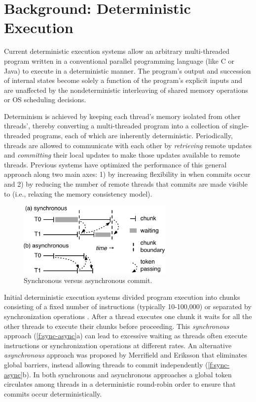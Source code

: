 \section{Background: Deterministic Execution}

Current deterministic execution systems \cite{liu_dthreads:_2011,merrifield_conversion:_2013,kai_lu_efficient_2014} allow an arbitrary multi-threaded program written in a conventional parallel programming language (like C or Java) to execute in a deterministic manner. The program's output and succession of internal states become solely a function of the program's explicit inputs and are unaffected by the nondeterministic interleaving of shared memory operations or OS scheduling decisions.

Determinism is achieved by keeping each thread's memory isolated from other threads', thereby converting a multi-threaded program into a collection of single-threaded programs, each of which are inherently deterministic. Periodically, threads are allowed to communicate with each other by \emph{retrieving} remote updates and \emph{committing} their local updates to make those updates available to remote threads. Previous systems have optimized the performance of this general approach along two main axes: 1) by increasing flexibility in when commits occur and 2) by reducing the number of remote threads that commits are made visible to (i.e., relaxing the memory consistency model).

\begin{figure}
\includegraphics[width=3.0in]{figures/sync-async-chunks.pdf}
\caption{Synchronous versus asynchronous commit.}
\label{f:sync-async}
\end{figure}

Initial deterministic execution systems divided program execution into chunks consisting of a fixed number of instructions (typically 10-100,000) \cite{devietti_dmp:_2009,bergan_coredet:_2010,derek_r._hower_calvin:_2011} or separated by synchronization operations \cite{liu_dthreads:_2011}. 
After a thread executes one chunk it waits for all the other threads to execute their chunks before proceeding. This \emph{synchronous} approach (\autoref{f:sync-async}a) can lead to excessive waiting as threads often execute instructions or synchronization operations at different rates. An alternative \emph{asynchronous} approach was proposed by Merrifield and Eriksson \cite{merrifield_conversion:_2013} that eliminates global barriers, instead allowing threads to commit independently (\autoref{f:sync-async}b). In both synchronous and asynchronous approaches a global token circulates among threads in a deterministic round-robin order to ensure that commits occur deterministically.


